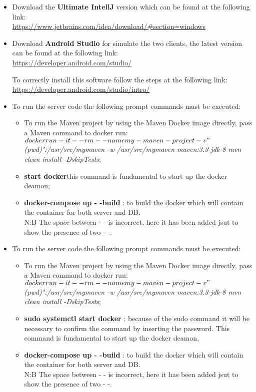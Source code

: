 \begin{itemize}
	\item Download the \textbf{Ultimate IntellJ} version which can be found at the following link:\\
 		\url{https://www.jetbrains.com/idea/download/#section=windows}

	\item Download \textbf{Android Studio} for simulate the two clients, the latest version can be found at the following link:\\
		\url{https://developer.android.com/studio/}

		To correctly install this software follow the steps at the following link:\\
		\url{https://developer.android.com/studio/intro/}

	\item To run the server code the following prompt commands must be executed:\\
		\begin{itemize}
			\item To run the  Maven project by using the Maven Docker image directly, pass a Maven command to docker 					run:\\
\textit{$ docker run -it --rm --name my-maven-project -v "$(pwd)":/usr/src/mymaven -w /usr/src/mymaven maven:3.3-jdk-8 mvn clean install -DskipTests};
			\item \textbf{start docker}this command is fundamental to start up the docker deamon;	
			\item \textbf{ docker-compose up - -build} : to build the docker which will contain the container for both server 					and DB.\\N:B The space between - - is incorrect, here it has been added jsut to show the presence of two - -.
		\end{itemize}

	\item To run the server code the following prompt commands must be executed:\\
	
		\begin{itemize}
			\item To run the  Maven project by using the Maven Docker image directly, pass a Maven command to docker 					run:\\
\textit{$ docker run -it --rm --name my-maven-project -v "$(pwd)":/usr/src/mymaven -w /usr/src/mymaven maven:3.3-jdk-8 mvn clean install -DskipTests};
			\item \textbf{ sudo systemctl start docker} : because of the sudo command it will be necessary to confirm the 					command by inserting the password. This command is fundamental to start up the docker deamon,	
			\item \textbf{ docker-compose up - -build} : to build the docker which will contain the container for both server 					and DB.\\N:B The space between - - is incorrect, here it has been added jsut to show the presence of two - -.
		\end{itemize}


\end{itemize}
